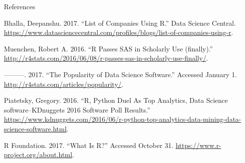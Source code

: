 \begin{frame}{References}

\hypertarget{refs}{}
\hypertarget{ref-bhalla}{}
Bhalla, Deepanshu. 2017. ``List of Companies Using R.'' Data Science
Central.
\url{https://www.datasciencecentral.com/profiles/blogs/list-of-companies-using-r}.

\hypertarget{ref-muenchen2}{}
Muenchen, Robert A. 2016. ``R Passes SAS in Scholarly Use (finally).''
\url{http://r4stats.com/2016/06/08/r-passes-sas-in-scholarly-use-finally/}.

\hypertarget{ref-muenchen}{}
---------. 2017. ``The Popularity of Data Science Software.'' Accessed
January 1. \url{http://r4stats.com/articles/popularity/}.

\hypertarget{ref-kdnuggets1}{}
Piatetsky, Gregory. 2016. ``R, Python Duel As Top Analytics, Data
Science software--KDnuggets 2016 Software Poll Results.''
\url{https://www.kdnuggets.com/2016/06/r-python-top-analytics-data-mining-data-science-software.html}.

\hypertarget{ref-rfoundation}{}
R Foundation. 2017. ``What Is R?'' Accessed October 31.
\url{https://www.r-project.org/about.html}.

\end{frame}
